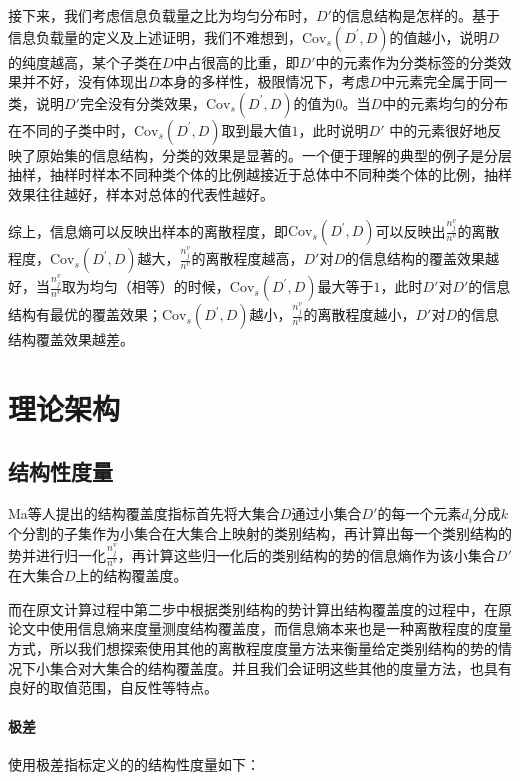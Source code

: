 \documentclass{../notes}
\newcommand{\Cov}{\text{Cov}}
\begin{document}
    接下来，我们考虑信息负载量之比为均匀分布时，$D'$的信息结构是怎样的。基于信息负载量的定义及上述证明，我们不难想到，$\Cov_s(D^\prime,D)$的值越小，说明$D$的纯度越高，某个子类在$D$中占很高的比重，即$D'$中的元素作为分类标签的分类效果并不好，没有体现出$D$本身的多样性，极限情况下，考虑$D$中元素完全属于同一类，说明$D'$完全没有分类效果，$\Cov_s(D^\prime,D)$的值为$0$。当$D$中的元素均匀的分布在不同的子类中时，$\Cov_s(D^\prime,D)$取到最大值$1$，此时说明$D'$ 中的元素很好地反映了原始集的信息结构，分类的效果是显著的。一个便于理解的典型的例子是分层抽样，抽样时样本不同种类个体的比例越接近于总体中不同种类个体的比例，抽样效果往往越好，样本对总体的代表性越好。

    综上，信息熵可以反映出样本的离散程度，即$\Cov_s(D^\prime,D)$可以反映出$\frac{n_j^v}{n^v}$的离散程度，$\Cov_s(D^\prime,D)$越大，$\frac{n_j^v}{n^v}$的离散程度越高，$D'$对$D$的信息结构的覆盖效果越好，当$\frac{n_j^v}{n^v}$取为均匀（相等）的时候，$\Cov_s(D^\prime,D)$最大等于$1$，此时$D'$对$D'$的信息结构有最优的覆盖效果；$\Cov_s(D^\prime,D)$越小，$\frac{n_j^v}{n^v}$的离散程度越小，$D'$对$D$的信息结构覆盖效果越差。

    \section{理论架构}

    \subsection{结构性度量}

    Ma等人提出的结构覆盖度指标首先将大集合$D$通过小集合$D'$的每一个元素$d_i$分成$k$个分割的子集作为小集合在大集合上映射的类别结构，再计算出每一个类别结构的势并进行归一化$\frac{n_j^v}{n^v}$，再计算这些归一化后的类别结构的势的信息熵作为该小集合$D'$在大集合$D$上的结构覆盖度。


    而在原文计算过程中第二步中根据类别结构的势计算出结构覆盖度的过程中，在原论文中使用信息熵来度量测度结构覆盖度，而信息熵本来也是一种离散程度的度量方式，所以我们想探索使用其他的离散程度度量方法来衡量给定类别结构的势的情况下小集合对大集合的结构覆盖度。并且我们会证明这些其他的度量方法，也具有良好的取值范围，自反性等特点。

    \paragraph*{极差}

    使用极差指标定义的的结构性度量如下：
\end{document}
